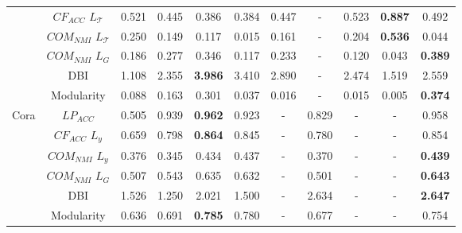 \begin{table*}[t!]
{\begin{tabular}{ccccccccccc}
    & $CF_{ACC}$ $L_\mathcal{T}$    & 0.521     & 0.445         & 0.386         & 0.384     & 0.447     &     -     & 0.523         & \textbf{0.887}& 0.492 \\
    & $COM_{NMI}$ $L_\mathcal{T}$   & 0.250     & 0.149         & 0.117         & 0.015     & 0.161     &     -     & 0.204         & \textbf{0.536}  & 0.044 \\
    & $COM_{NMI}$ $L_G$             & 0.186     & 0.277         & 0.346         & 0.117     & 0.233     &     -     & 0.120         & 0.043  & \textbf{0.389} \\
    & DBI                           & 1.108     & 2.355         & \textbf{3.986}& 3.410     & 2.890     &     -     & 2.474         & 1.519  & 2.559 \\
    & Modularity                    & 0.088     & 0.163         & 0.301         & 0.037     & 0.016     &     -     & 0.015         & 0.005  & \textbf{0.374} \\\midrule
\multirow{6}{*}{Cora} 
    & $LP_{ACC}$                    & 0.505     & 0.939         &\textbf{0.962} &0.923      & -         & 0.829     & -             & -     & 0.958 \\
    & $CF_{ACC}$ $L_y$              & 0.659     & 0.798         &\textbf{0.864} &0.845      & -         & 0.780     & -             & -     & 0.854 \\
    & $COM_{NMI}$ $L_y$             & 0.376     & 0.345         & 0.434         & 0.437     & -         & 0.370     & -             & -     &\textbf{0.439} \\
    & $COM_{NMI}$ $L_G$             & 0.507     & 0.543         & 0.635         & 0.632     & -         & 0.501     & -             & -     &\textbf{0.643} \\
    & DBI                           & 1.526     & 1.250         & 2.021         & 1.500     & -         & 2.634     & -             & -     &\textbf{2.647} \\
    & Modularity                    & 0.636     & 0.691         &\textbf{0.785} &  0.780    & -         & 0.677     & -             & -     &0.754 \\
\bottomrule
\end{tabular}
}
\end{table*}


